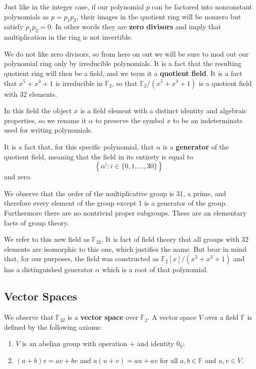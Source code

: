 \documentclass[letterpaper]{article}
\theoremstyle{xxx}
\theoremstyle{evil}
\theoremstyle{yyy}
\theoremstyle{plain}
\theoremstyle{zzz}
\newcommand{\ftwo}{\mathbb{F}_2}
\newcommand{\fttwo}{\mathbb{F}_{32}}
\begin{document}
Just like in the integer case, if our polynomial $p$ can be factored into
nonconstant polynomials as $p=p_1p_2$, their images in the quotient ring will
be nonzero but satisfy $p_1p_2 = 0$. In other words they are \textbf{zero
divisors} and imply that multiplication in the ring is not invertible.

We do not like zero divisors, so from here on out we will be sure to mod out
our polynomial ring only by irreducible polynomials. It is a fact that the
resulting quotient ring will then be a field, and we term it a \textbf{quotient
field}. It is a fact that $x^5 + x^3 + 1$ is irreducible in $\ftwo$, so that
$\ftwo/(x^5 + x^3 + 1)$ is a quotient field with 32 elements.

In this field the object $x$ is a field element with a distinct identity and
algebraic properties, so we rename it $\alpha$ to preserve the symbol $x$ to
be an indeterminate used for writing polynomials.

It is a fact that, for this specific polynomial, that $\alpha$ is a
\textbf{generator} of the quotient field, meaning that the field in its entirety
is equal to
\[ \left\{ \alpha^i : i \in \{0,1,\ldots,30\} \right\} \]
and zero.

We observe that the order of the multiplicative group is 31, a prime, and therefore
every element of the group except 1 is a generator of the group. Furthermore there
are no nontrivial proper subgroups. These are an elementary facts of group theory.

We refer to this new field as $\fttwo$. It is fact of field theory that all
groups with 32 elements are isomorphic to this one, which justifies the name.
But bear in mind that, for our purposes, the field was constructed as $\ftwo[x]/
(x^5 + x^3 + 1)$ and has a distinguished generator $\alpha$ which is a root
of that polynomial.

\subsection{Vector Spaces}

We observe that $\fttwo$ is a \textbf{vector space} over $\ftwo$. A vector
space $V$ over a field $\mathbb{F}$ is defined by the following axioms:

\begin{enumerate}
\item $V$ is an abelian group with operation $+$ and identity $0_V$.
\item $(a + b)v = av + bv$ and $a(u + v) = au + av$ for all $a,b\in \mathbb{F}$ and
$u,v\in V$.
\end{enumerate}
\end{document}
